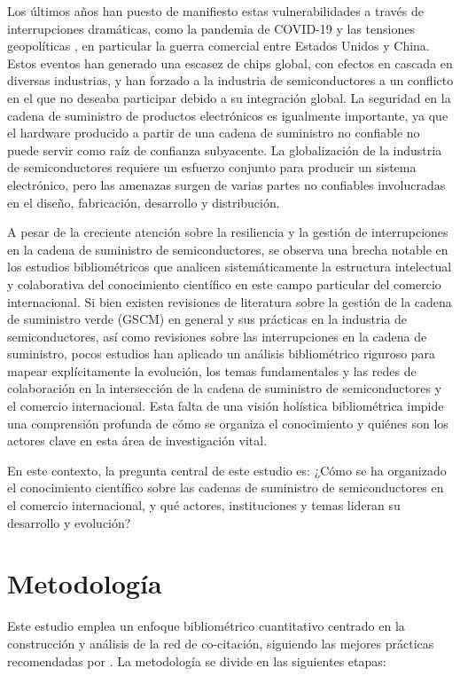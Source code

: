 \documentclass[twoside, twocolumn]{article}
\newcommand{\1}{\mathds{1}}						%
\begin{document}
Los últimos años han puesto de manifiesto estas vulnerabilidades a través de interrupciones dramáticas, como la pandemia de COVID-19 y las tensiones geopolíticas \cite{Xiong2024}, en particular la guerra comercial entre Estados Unidos y China. Estos eventos han generado una escasez de chips global, con efectos en cascada en diversas industrias, y han forzado a la industria de semiconductores a un conflicto en el que no deseaba participar debido a su integración global. La seguridad en la cadena de suministro de productos electrónicos es igualmente importante, ya que el hardware producido a partir de una cadena de suministro no confiable no puede servir como raíz de confianza subyacente. La globalización de la industria de semiconductores requiere un esfuerzo conjunto para producir un sistema electrónico, pero las amenazas surgen de varias partes no confiables involucradas en el diseño, fabricación, desarrollo y distribución.

A pesar de la creciente atención sobre la resiliencia y la gestión de interrupciones en la cadena de suministro de semiconductores, se observa una brecha notable en los estudios bibliométricos que analicen sistemáticamente la estructura intelectual y colaborativa del conocimiento científico en este campo particular del comercio internacional. Si bien existen revisiones de literatura sobre la gestión de la cadena de suministro verde (GSCM) en general y sus prácticas en la industria de semiconductores, así como revisiones sobre las interrupciones en la cadena de suministro, pocos estudios han aplicado un análisis bibliométrico riguroso para mapear explícitamente la evolución, los temas fundamentales y las redes de colaboración en la intersección de la cadena de suministro de semiconductores y el comercio internacional. Esta falta de una visión holística bibliométrica impide una comprensión profunda de cómo se organiza el conocimiento y quiénes son los actores clave en esta área de investigación vital.

En este contexto, la pregunta central de este estudio es: ¿Cómo se ha organizado el conocimiento científico sobre las cadenas de suministro de semiconductores en el comercio internacional, y qué actores, instituciones y temas lideran su desarrollo y evolución?


\section{Metodología}
Este estudio emplea un enfoque bibliométrico cuantitativo centrado en la construcción y análisis de la red de co-citación, siguiendo las mejores prácticas recomendadas por \cite{Donthu2021}. La metodología se divide en las siguientes etapas:
\end{document}
